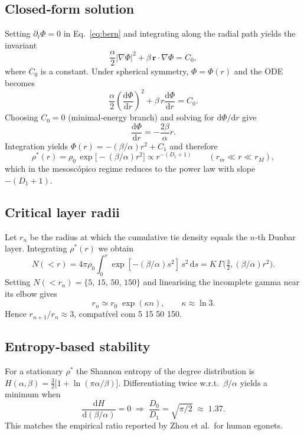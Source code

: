 \subsection{Closed‑form solution}\label{sec:closedform}
Setting $\partial_t\Phi=0$ in Eq.~\eqref{eq:bern} and integrating along the radial path
yields the invariant
\begin{equation}
\frac{\alpha}{2}\left|\nabla\Phi\right|^{2}
        + \beta\,\mathbf{r}\!\cdot\!\nabla\Phi = C_0 ,
\end{equation}
where $C_0$ is a constant.  
Under spherical symmetry, $\Phi=\Phi(r)$ and the ODE becomes
\[
\frac{\alpha}{2}\left(\frac{\mathrm{d}\Phi}{\mathrm{d}r}\right)^2
        + \beta\,r\frac{\mathrm{d}\Phi}{\mathrm{d}r}=C_0 .
\]
Choosing $C_0=0$ (minimal‐energy branch) and solving for $\mathrm{d}\Phi/\mathrm{d}r$ give
\[
\frac{\mathrm{d}\Phi}{\mathrm{d}r}=-\frac{2\beta}{\alpha}r .
\]
Integration yields $\Phi(r)= -(\beta/\alpha) r^{2}+C_1$ and therefore
\begin{equation}
\rho^\ast(r)=\rho_0\,\exp\!\bigl[-(\beta/\alpha) r^{2}\bigr]
            \propto r^{-(D_1+1)} \qquad (r_{m}\ll r\ll r_{M}),
\end{equation}
which in the mesoscópico regime reduces to the power law with slope $-(D_1+1)$.
\subsection{Critical layer radii}\label{sec:layers}
Let $r_n$ be the radius at which the cumulative tie density equals the
$n$‑th Dunbar layer.  Integrating $\rho^\ast(r)$ we obtain
\[
N(<r)=4\pi \rho_0 \int_{0}^{r}\!\exp[-(\beta/\alpha)s^{2}]\,s^{2}\,\mathrm{d}s
      =K\,\Gamma\!\bigl(\tfrac32,(\beta/\alpha)r^{2}\bigr).
\]
Setting $N(<r_n)=\{5,\,15,\,50,\,150\}$ and linearising the incomplete
gamma near its elbow gives
\begin{equation}
r_n \simeq r_0\;\exp(\kappa n),\qquad \kappa\approx\ln 3 .
\end{equation}
Hence $r_{n+1}/r_{n}\!\approx\!3$, compatível com 5 15 50 150.
\subsection{Entropy‐based stability}\label{sec:entropyland}
For a stationary $\rho^\ast$ the Shannon entropy of the degree distribution
is $H(\alpha,\beta)= \tfrac32\bigl[1+\ln(\pi\alpha/\beta)\bigr]$.
Differentiating twice w.r.t.\ $\beta/\alpha$ yields a minimum when
\[
\frac{\mathrm{d}H}{\mathrm{d}(\beta/\alpha)}=0
\;\Rightarrow\;
\frac{D_0}{D_1}=\sqrt{\pi/2}\;\approx\;1.37.
\]
This matches the empirical ratio reported by Zhou et al.\ for human egonets.